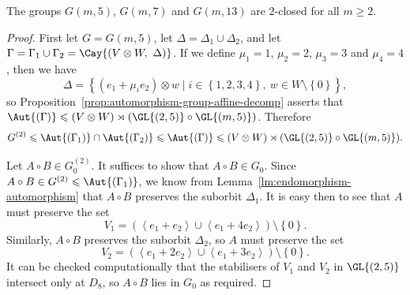 \begin{theorem} \label{thm:2-closed}
The groups $G{\left(m, 5 \right)}$, $G{\left(m, 7 \right)}$ and $G{\left(m, 13 \right)}$ are $2$-closed for all $m \geqslant 2$.
\end{theorem}
\begin{proof}
First let $G = G{\left(m, 5 \right)}$, let $\Delta = \Delta_1 \cup \Delta_2$, and let $\Gamma = \Gamma_1 \cup \Gamma_2 = \Cay{\left(V \otimes W,\ \Delta \right)}$. If we define $\mu_1 = 1$, $\mu_2 = 2$, $\mu_3 = 3$ and $\mu_4 = 4$, then we have
\begin{displaymath}
    \Delta = {\left\{\left(e_1 + \mu_i e_2 \right) \otimes w \mid i \in {\left\{1, 2, 3, 4 \right\}},\ w \in W \setminus \left\{0 \right\}\right\}},
\end{displaymath}
so Proposition~\ref{prop:automorphism-group-affine-decomp} asserts that $\Aut{\left(\Gamma \right)} \leqslant \left(V \otimes W \right) \rtimes \left(\GL{\left(2, 5 \right)} \circ \GL{\left(m, 5 \right)}\right)$. Therefore
\begin{displaymath}
    G^{\left(2 \right)} \leqslant \Aut{\left(\Gamma_1 \right)} \cap \Aut{\left(\Gamma_2 \right)} \leqslant \Aut{\left(\Gamma \right)} \leqslant \left(V \otimes W \right) \rtimes {\left(\GL{\left(2, 5 \right)} \circ \GL{\left(m, 5 \right)}\right)}.
\end{displaymath}

Let $A \circ B \in G^{\left(2 \right)}_0$. It suffices to show that $A \circ B \in G_0$. Since $A \circ B \in G^{\left(2 \right)} \leqslant \Aut{\left(\Gamma_1 \right)}$, we know from Lemma~\ref{lm:endomorphism-automorphism} that $A \circ B$ preserves the suborbit $\Delta_1$. It is easy then to see that $A$ must preserve the set
\begin{displaymath}
    V_1 = \left(\left<e_1 + e_2 \right> \cup \left<e_1 + 4 e_2 \right> \right) \setminus {\left\{0 \right\}}.
\end{displaymath}
Similarly, $A \circ B$ preserves the suborbit $\Delta_2$, so $A$ must preserve the set
\begin{displaymath}
    V_2 = \left(\left<e_1 + 2 e_2 \right> \cup \left<e_1 + 3 e_2 \right> \right) \setminus {\left\{0 \right\}}.
\end{displaymath}
It can be checked computationally that the stabilisers of $V_1$ and $V_2$ in $\GL{\left(2, 5 \right)}$ intersect only at $D_8$, so $A \circ B$ lies in $G_0$ as required.


\end{proof}
